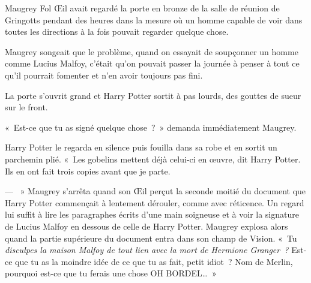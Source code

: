 \later

Maugrey Fol Œil avait regardé la porte en bronze de la salle de réunion de Gringotts pendant des heures dans la mesure où un homme capable de voir dans toutes les directions à la fois pouvait regarder quelque chose.

Maugrey songeait que le problème, quand on essayait de soupçonner un homme comme Lucius Malfoy, c'était qu'on pouvait passer la journée à penser à tout ce qu'il pourrait fomenter et n'en avoir toujours pas fini.

La porte s'ouvrit grand et Harry Potter sortit à pas lourds, des gouttes de sueur sur le front.

«~Est-ce que tu as signé quelque chose~?~»
demanda immédiatement Maugrey.

Harry Potter le regarda en silence puis fouilla dans sa robe et en sortit un parchemin plié.
«~Les gobelins mettent déjà celui-ci en œuvre, dit Harry Potter.
Ils en ont fait trois copies avant que je parte.

--- ~» Maugrey s'arrêta quand son Œil perçut la seconde moitié du document que Harry Potter commençait à lentement dérouler, comme avec réticence.
Un regard lui suffit à lire les paragraphes écrits d'une main soigneuse et à voir la signature de Lucius Malfoy en dessous de celle de Harry Potter.
Maugrey explosa alors quand la partie supérieure du document entra dans son champ de Vision.
«~Tu \emph{disculpes la maison Malfoy de tout lien avec la mort de Hermione Granger~?} Est-ce que tu as la moindre idée de ce que tu as fait, petit idiot~?
Nom de Merlin, pourquoi est-ce que tu ferais une chose OH BORDEL…~»
